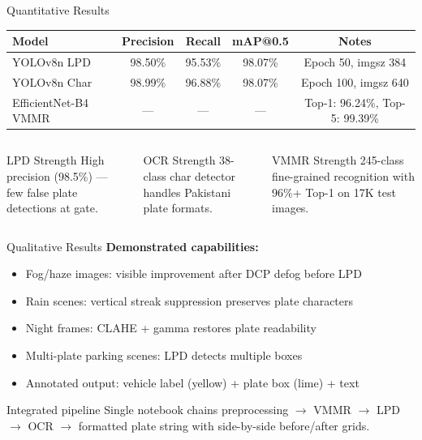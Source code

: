 \documentclass[aspectratio=169,11pt]{beamer}
\begin{document}
\begin{frame}{Quantitative Results}
  \centering
  \begin{tabular}{@{}lcccc@{}}
    \toprule
    \textbf{Model} & \textbf{Precision} & \textbf{Recall} & \textbf{mAP@0.5} & \textbf{Notes} \\
    \midrule
    YOLOv8n LPD & 98.50\% & 95.53\% & 98.07\% & Epoch 50, imgsz 384 \\
    YOLOv8n Char & 98.99\% & 96.88\% & 98.07\% & Epoch 100, imgsz 640 \\
    EfficientNet-B4 VMMR & --- & --- & --- & Top-1: 96.24\%, Top-5: 99.39\% \\
    \bottomrule
  \end{tabular}
  \vspace{0.8em}

  \begin{columns}[T]
    \begin{block}{LPD Strength}
      High precision (98.5\%) --- few false plate detections at gate.
    \end{block}
    \begin{block}{OCR Strength}
      38-class char detector handles Pakistani plate formats.
    \end{block}
    \begin{block}{VMMR Strength}
      245-class fine-grained recognition with 96\%+ Top-1 on 17K test images.
    \end{block}
  \end{columns}
\end{frame}

\begin{frame}{Qualitative Results}
  \textbf{Demonstrated capabilities:}
  \begin{itemize}
    \item Fog/haze images: visible improvement after DCP defog before LPD
    \item Rain scenes: vertical streak suppression preserves plate characters
    \item Night frames: CLAHE + gamma restores plate readability
    \item Multi-plate parking scenes: LPD detects multiple boxes
    \item Annotated output: vehicle label (yellow) + plate box (lime) + text
  \end{itemize}
  \vspace{0.4em}
  \begin{alertblock}{Integrated pipeline}
    Single notebook chains preprocessing $\rightarrow$ VMMR $\rightarrow$ LPD $\rightarrow$ OCR
    $\rightarrow$ formatted plate string with side-by-side before/after grids.
  \end{alertblock}
\end{frame}
\end{document}
